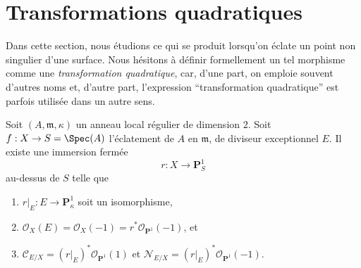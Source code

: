 \section{Transformations quadratiques} \label{section-quadratic}

\noindent Dans cette section, nous étudions ce qui se produit lorsqu'on éclate un point non singulier d'une surface. Nous hésitons à définir formellement un tel morphisme comme une {\it transformation quadratique}, car, d'une part, on emploie souvent d'autres noms et, d'autre part, l'expression ``transformation quadratique'' est parfois utilisée dans un autre sens.

\begin{lemma} \label{lemma-blowup} Soit $(A, \mathfrak m, \kappa)$ un anneau local régulier de dimension $2$. Soit $f : X \to S = \Spec(A)$ l'éclatement de $A$ en $\mathfrak m$, de diviseur exceptionnel $E$. Il existe une immersion fermée $$
r : X \longrightarrow \mathbf{P}^1_S
$$ au-dessus de $S$ telle que \begin{enumerate} \item $r|_E : E \to \mathbf{P}^1_\kappa$ soit un isomorphisme, \item $\mathcal{O}_X(E) = \mathcal{O}_X(-1) =
r^*\mathcal{O}_{\mathbf{P}^1}(-1)$, et \item $\mathcal{C}_{E/X} = (r|_E)^*\mathcal{O}_{\mathbf{P}^1}(1)$ et $\mathcal{N}_{E/X} = (r|_E)^*\mathcal{O}_{\mathbf{P}^1}(-1)$. \end{enumerate} \end{lemma}

